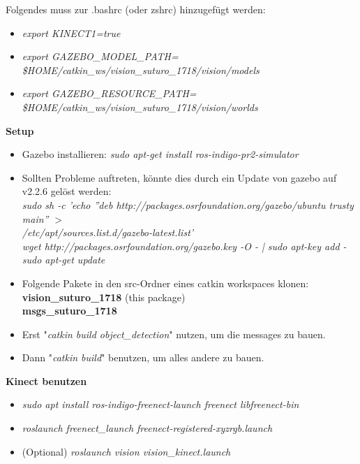 \documentclass{suturo}
\begin{document}
Folgendes muss zur .bashrc (oder zshrc) hinzugefügt werden:
\begin{itemize}
\item \textit{export KINECT1=true}
\item \textit{export GAZEBO\_MODEL\_PATH= \$HOME/catkin\_ws/vision\_suturo\_1718/vision/models}
\item \textit{export GAZEBO\_RESOURCE\_PATH= \$HOME/catkin\_ws/vision\_suturo\_1718/vision/worlds}
\end{itemize}

\textbf{Setup}

\begin{itemize}
\item Gazebo installieren: \textit{sudo apt-get install ros-indigo-pr2-simulator}

\item Sollten Probleme auftreten, könnte dies durch ein Update von gazebo auf v2.2.6 gelöst werden:
\\
\textit{sudo sh -c 'echo ''deb http://packages.osrfoundation.org/gazebo/ubuntu trusty main'' $>$ \\ 
/etc/apt/sources.list.d/gazebo-latest.list'}
\\
\textit{wget http://packages.osrfoundation.org/gazebo.key -O - | sudo apt-key add -}
\\
\textit{sudo apt-get update}

\item Folgende Pakete in den src-Ordner eines catkin workspaces klonen:\\
        \textbf{vision\_suturo\_1718} (this package) \\
        \textbf{msgs\_suturo\_1718}
\item Erst "\textit{catkin build object\_detection}" nutzen, um die messages zu bauen.
\item Dann "\textit{catkin build}" benutzen, um alles andere zu bauen.

\end{itemize}

\textbf{Kinect benutzen}
\begin{itemize}
\item \textit{sudo apt install ros-indigo-freenect-launch freenect libfreenect-bin}
\item \textit{roslaunch freenect\_launch freenect-registered-xyzrgb.launch}
\item (Optional) \textit{roslaunch vision vision\_kinect.launch}
\end{itemize}
\end{document}
